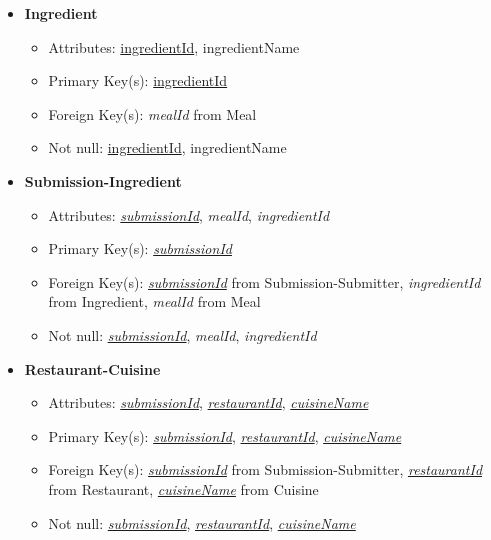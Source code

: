 \documentclass{article}
\begin{document}
\begin{itemize}
        \item \textbf{Ingredient}
        \begin{itemize}
            \item Attributes: \underline{ingredientId}, ingredientName
            \item Primary Key(s): \underline{ingredientId}
            \item Foreign Key(s): \textit{mealId} from Meal
            \item Not null: \underline{ingredientId}, ingredientName
        \end{itemize}

        \item \textbf{Submission-Ingredient}
        \begin{itemize}            
            \item Attributes: \underline{\textit{submissionId}}, \textit{mealId}, \textit{ingredientId}
            \item Primary Key(s): \underline{\textit{submissionId}}
            \item Foreign Key(s): \underline{\textit{submissionId}} from Submission-Submitter, \textit{ingredientId} from Ingredient, \textit{mealId} from Meal
            \item Not null: \underline{\textit{submissionId}}, \textit{mealId}, \textit{ingredientId}
        \end{itemize}

        \item \textbf{Restaurant-Cuisine}
        \begin{itemize}
            \item Attributes: \underline{\textit{submissionId}}, \underline{\textit{restaurantId}}, \underline{\textit{cuisineName}}
            \item Primary Key(s): \underline{\textit{submissionId}}, \underline{\textit{restaurantId}}, \underline{\textit{cuisineName}}
            \item Foreign Key(s): \underline{\textit{submissionId}} from Submission-Submitter, \underline{\textit{restaurantId}} from Restaurant, \underline{\textit{cuisineName}} from Cuisine
            \item Not null: \underline{\textit{submissionId}}, \underline{\textit{restaurantId}}, \underline{\textit{cuisineName}}
        \end{itemize}

    \end{itemize}
    
\end{document}
